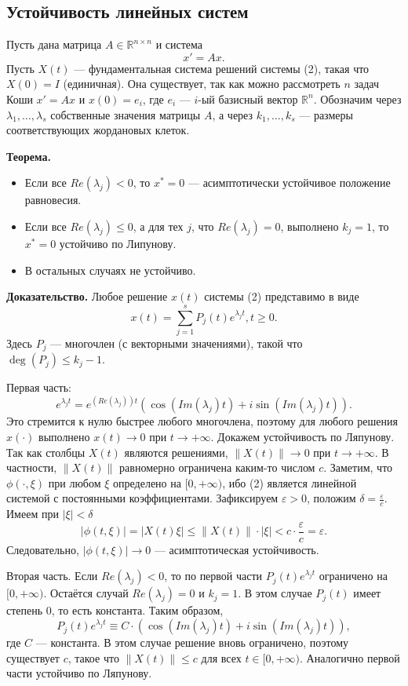 \subsection{Устойчивость линейных систем}
Пусть дана матрица $A \in \mathbb R^{n \times n}$ и система
\begin{equation}
    x' = Ax.
\end{equation}
Пусть $X(t)$ --- фундаментальная система решений системы (2), такая что $X(0) = I$ (единичная).
Она существует, так как можно рассмотреть $n$ задач Коши $x' = Ax$ и $x(0) = e_i$, где $e_i$ --- $i$-ый базисный вектор $\mathbb R^n$.
Обозначим через $\lambda_1, \dots, \lambda_s$ собственные значения матрицы $A$, а через $k_1, \dots, k_s$ --- размеры соответствующих жордановых клеток.

\textbf{Теорема.} 
\begin{itemize}
    \item Если все $Re(\lambda_j) < 0$, то $x^* = 0$ --- асимптотически устойчивое положение равновесия.
    \item Если все $Re(\lambda_j) \le 0$, а для тех $j$, что $Re(\lambda_j) = 0$, выполнено $k_j = 1$, то $x^* = 0$ устойчиво по Липунову.
    \item В остальных случаях не устойчиво.
\end{itemize}

\textbf{Доказательство.} Любое решение $x(t)$ системы (2) представимо в виде
\[
    x(t) = \sum_{j=1}^{s} P_j(t) e^{\lambda_j t}, t \ge 0.
\]
Здесь $P_j$ --- многочлен (с векторными значениями), такой что $\deg(P_j) \le k_j - 1$.

Первая часть:
\[
    e^{\lambda_j t} = e^{(Re(\lambda_j)) t} (\cos(Im(\lambda_j) t) + i \sin(Im(\lambda_j) t)).
\]
Это стремится к нулю быстрее любого многочлена, поэтому для любого решения $x(\cdot)$ выполнено $x(t) \to 0$ при $t \to +\infty$.
Докажем устойчивость по Ляпунову.
Так как столбцы $X(t)$ являются решениями, $\|X(t)\| \to 0$ при $t \to +\infty$.
В частности, $\|X(t)\|$ равномерно ограничена каким-то числом $c$.
Заметим, что $\phi(\cdot, \xi)$ при любом $\xi$ определено на $[0, +\infty)$, ибо (2) является линейной системой с постоянными коэффициентами.
Зафиксируем $\varepsilon > 0$, положим $\delta = \frac{\varepsilon}{c}$.
Имеем при $|\xi| < \delta$
\[
    |\phi(t, \xi)| = |X(t) \xi| \le \| X(t) \| \cdot |\xi| < c \cdot \frac{\varepsilon}{c} = \varepsilon.
\]
Следовательно, $|\phi(t, \xi)| \to 0$ --- асимптотическая устойчивость.

Вторая часть. Если $Re(\lambda_j) < 0$, то по первой части $P_j(t) e^{\lambda_j t}$ ограничено на $[0, +\infty)$.
Остаётся случай $Re(\lambda_j) = 0$ и $k_j = 1$.
В этом случае $P_j(t)$ имеет степень 0, то есть константа.
Таким образом,
\[
    P_j(t) e^{\lambda_j t} \equiv C \cdot (\cos(Im(\lambda_j) t) + i \sin(Im(\lambda_j) t)),
\]
где $C$ --- константа.
В этом случае решение вновь ограничено, поэтому существует $c$, такое что $\|X(t)\| \le c$ для всех $t \in [0, +\infty)$.
Аналогично первой части устойчиво по Ляпунову.

